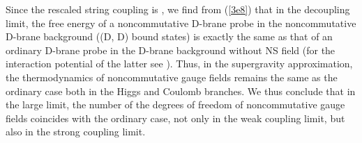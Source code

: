 \documentclass[a4paper,12pt]{article}
\begin{document}
Since the rescaled string coupling is \coordHE{},
we find from (\ref{3e8}) that in the decoupling limit, the free energy
of a noncommutative D\coordHE{}-brane probe in the noncommutative D\coordHE{}-brane
background ((D\coordHE{}, D\coordHE{}) bound states) is exactly the same as that of an
ordinary D\coordHE{}-brane probe in the D\coordHE{}-brane background without NS \coordHE{} field
(for the interaction potential of the latter see \cite{Kirit}). Thus,
in the supergravity approximation, the thermodynamics of noncommutative
gauge fields remains the same as the ordinary case both in the Higgs and
Coulomb branches. We thus conclude that in the large \coordHE{} limit, the number
of the degrees of freedom of noncommutative gauge fields coincides with
the ordinary case, not only in the weak coupling limit, but also in the
strong coupling limit.
\end{document}
